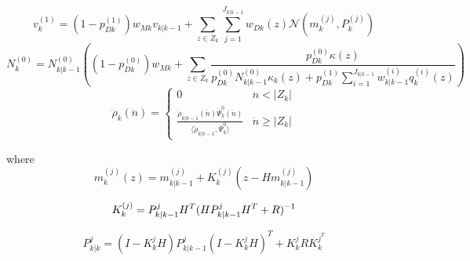 \documentclass{article}
\newcommand{\clut}{{(0)}}
\newcommand{\tgt}{{(1)}}
\begin{document}
\begin{equation}
  \label{eq:vk}
  v^{(1)}_k = (1-p_{Dk}^\tgt)w_{Mk}v_{k|k-1} + \sum_{z \in Z_k}\sum_{j=1}^{J_{k|k-1}}w_{Dk}(z)\mathcal{N}(m_k^{(j)},P_k^{(j)})
\end{equation}
\begin{equation}
  \label{eq:N0k}
  N_k^{(0)} = N_{k|k-1}^{(0)}\left( (1-p_{Dk}^\clut)w_{Mk} + \sum_{z \in Z_k}\frac{p_{Dk}^{(0)}\kappa(z)}{ p_{Dk}^{(0)}N_{k|k-1}^{(0)}\kappa_k(z) +  p_{Dk}^{(1)}\sum_{i=1}^{J_{k|k-1}}w_{k|k-1}^{(i)}q_k^{(i)}(z)} \right)
\end{equation}
\begin{equation}
  \label{eq:rhok}
  \ddot{\rho}_k(\ddot{n}) =
  \begin{cases}
    0 & \ddot{n} < |Z_k| \\
    \frac{ \ddot{\rho}_{k|k-1}(\ddot{n})\ddot{\Psi}_k^0(\ddot{n})}{\langle \ddot{\rho}_{k|k-1}, \ddot{\Psi}_k^0 \rangle  } & \ddot{n} \ge |Z_k|
  \end{cases}
\end{equation}

where
\begin{equation}
  \label{eq:mk}
  m_k^{(j)}(z) = m_{k|k-1}^{(j)} + K_k^{(j)}(z - Hm_{k|k-1}^{(j)})
\end{equation}

\begin{equation}
  \label{eq:kalman_gain}
  K_k^{(j)} = P_{k|k-1}^jH^T(HP_{k|k-1}^jH^T + R)^{-1}\\
\end{equation}

\begin{equation}
  \label{eq:Pk}
  P_{k|k}^j = (I - K_k^jH)P_{k|k-1}^j(I - K_k^jH)^T + K_k^jRK_k^{j^T}
\end{equation}
\end{document}
